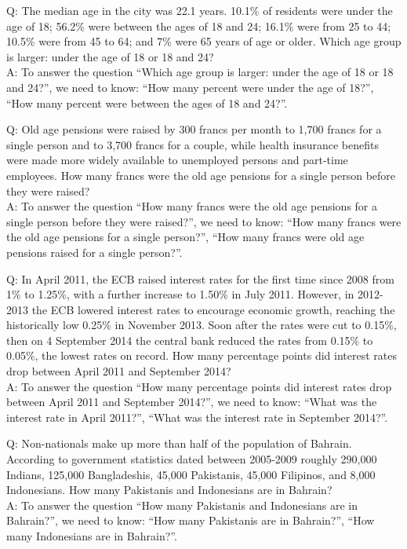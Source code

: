 Q: The median age in the city was 22.1 years. 10.1\% of residents were under the age of 18; 56.2\% were between the ages of 18 and 24; 16.1\% were from 25 to 44; 10.5\% were from 45 to 64; and 7\% were 65 years of age or older. Which age group is larger: under the age of 18 or 18 and 24?\\
A: To answer the question ``Which age group is larger: under the age of 18 or 18 and 24?'', we need to know: ``How many percent were under the age of 18?'', ``How many percent were between the ages of 18 and 24?''.

Q: Old age pensions were raised by 300 francs per month to 1,700 francs for a single person and to 3,700 francs for a couple, while health insurance benefits were made more widely available to unemployed persons and part-time employees. How many francs were the old age pensions for a single person before they were raised?\\
A: To answer the question ``How many francs were the old age pensions for a single person before they were raised?'', we need to know: ``How many francs were the old age pensions for a single person?'', ``How many francs were old age pensions raised for a single person?''.

Q: In April 2011, the ECB raised interest rates for the first time since 2008 from 1\% to 1.25\%, with a further increase to 1.50\% in July 2011. However, in 2012-2013 the ECB lowered interest rates to encourage economic growth, reaching the historically low 0.25\% in November 2013. Soon after the rates were cut to 0.15\%, then on 4 September 2014 the central bank reduced the rates from 0.15\% to 0.05\%, the lowest rates on record. How many percentage points did interest rates drop between April 2011 and September 2014?\\
A: To answer the question ``How many percentage points did interest rates drop between April 2011 and September 2014?'', we need to know: ``What was the interest rate in April 2011?'', ``What was the interest rate in September 2014?''.

Q: Non-nationals make up more than half of the population of Bahrain. According to government statistics dated between 2005-2009 roughly 290,000 Indians, 125,000 Bangladeshis, 45,000 Pakistanis, 45,000 Filipinos, and 8,000 Indonesians. How many Pakistanis and Indonesians are in Bahrain?\\
A: To answer the question ``How many Pakistanis and Indonesians are in Bahrain?'', we need to know: ``How many Pakistanis are in Bahrain?'', ``How many Indonesians are in Bahrain?''.

